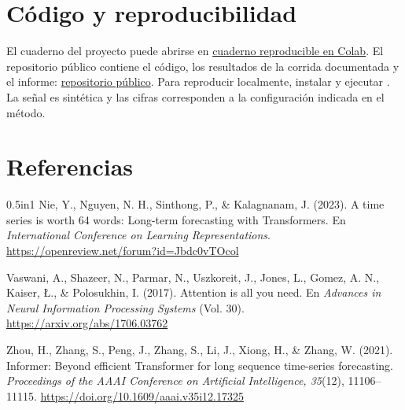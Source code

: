 \documentclass[12pt]{article}
\newcommand{\repo}{\href{https://github.com/sofiadelcal/karen-transformers-pronostico-73178}{repositorio público}}
\newcommand{\colab}{\href{https://colab.research.google.com/github/sofiadelcal/karen-transformers-pronostico-73178/blob/main/Karen_Transformers_Pronostico.ipynb}{cuaderno reproducible en Colab}}
\begin{document}
\section*{Código y reproducibilidad}
El cuaderno del proyecto puede abrirse en \colab. El repositorio público contiene el código, los resultados de la corrida documentada y el informe: \repo. Para reproducir localmente, instalar  y ejecutar . La señal es sintética y las cifras corresponden a la configuración indicada en el método.

\section*{Referencias}
\begin{hangparas}{0.5in}{1}
Nie, Y., Nguyen, N. H., Sinthong, P., \& Kalagnanam, J. (2023). A time series is worth 64 words: Long-term forecasting with Transformers. En \textit{International Conference on Learning Representations}. \url{https://openreview.net/forum?id=Jbdc0vTOcol}

Vaswani, A., Shazeer, N., Parmar, N., Uszkoreit, J., Jones, L., Gomez, A. N., Kaiser, Ł., \& Polosukhin, I. (2017). Attention is all you need. En \textit{Advances in Neural Information Processing Systems} (Vol. 30). \url{https://arxiv.org/abs/1706.03762}

Zhou, H., Zhang, S., Peng, J., Zhang, S., Li, J., Xiong, H., \& Zhang, W. (2021). Informer: Beyond efficient Transformer for long sequence time-series forecasting. \textit{Proceedings of the AAAI Conference on Artificial Intelligence, 35}(12), 11106--11115. \url{https://doi.org/10.1609/aaai.v35i12.17325}
\end{hangparas}
\end{document}
